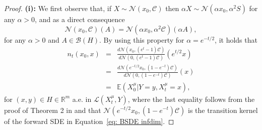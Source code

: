 \documentclass[10pt]{article} %
\def\Eqref#1{Equation~\ref{#1}}
\newcommand{\E}{\mathbb{E}}
\newcommand{\R}{\mathbb{R}}
\theoremstyle{plain}
\theoremstyle{definition}
\theoremstyle{remark}
\renewcommand{\L}{\mathscr{L}}
\newcommand{\C}{\mathcal C}
\newcommand{\N}{\mathcal N}
\begin{document}
\begin{proof}
{\bf (i):} We first observe that, if $X \sim \N(x_0, \C)$ then $\alpha X \sim \N(\alpha x_0, \alpha^2 S)$ for any $\alpha > 0$, and as a direct consequence
\begin{equation}
    \label{eq:multiplying_gaussian_rv}
    \N(x_0, \C)(A) = \N(\alpha x_0, \alpha^2 \C)(\alpha A),
\end{equation}
for any $\alpha > 0$ and $A\in \mathcal{B}(H)$.
By using this property for $\alpha = e^{-t/2}$, it holds that
\begin{eqnarray*}
    n_t(x_0, x) & = & \frac{d \N( x_0, (e^t-1) \C)}{d \N(0, (e^t-1) \C)}(e^{t/2}x) \\ 
    & = & \frac{d \N(e^{-t/2} x_0, (1-e^{-t}) \C)}{d \N(0, (1-e^{-t}) \C)}(x) \\
       & =& \E(X^{\mu}_0 | Y = y, X^{\mu}_t = x),
\end{eqnarray*}
for $(x,y) \in H \in \R^m$ a.e. in $\L(X_t^\mu, Y)$, where the last equality follows from the proof of Theorem 2 in %
\citet{pidstrigach2023infinitedimensional} and that $\N(e^{-t/2} x_0, (1-e^{-t}) \C)$ is the transition kernel of the forward SDE in \Eqref{eq: BSDE infdim}.


\end{proof}
\end{document}
